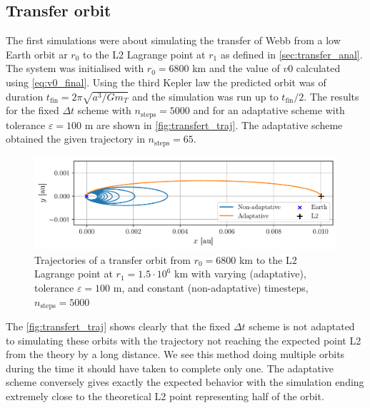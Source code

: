 \subsection{Transfer orbit}
The first simulations were about simulating the transfer of Webb from a low Earth orbit ar $r_0$ to the L2 Lagrange point at $r_1$ as defined in \autoref{sec:transfer_anal}. The system was initialised with \(r_0 = 6800\) km and the value of $v0$ calculated using \autoref{eq:v0_final}. Using the third Kepler law the predicted orbit was of duration $t_\mathrm{fin} = 2\pi\sqrt{a^3/Gm_T}$ and the simulation was run up to $t_\mathrm{fin}/2$. The results for the fixed $\Delta t$ scheme with $n_\mathrm{steps} = 5000$ and for an adaptative scheme with tolerance $\varepsilon = 100$ \si{\meter} are shown in \autoref{fig:transfert_traj}. The adaptative scheme obtained the given trajectory in $n_\mathrm{steps} = 65$.
\begin{figure}[H]
    \centering
    \includegraphics[width=\linewidth]{figures/transfert_comparaison.pdf}
    \caption{Trajectories of a transfer orbit from $r_0 = 6800$ \si{\kilo\meter} to the L2 Lagrange point at $r_1 = 1.5 \cdot 10^6$ \si{\kilo\meter} with varying (adaptative), tolerance $\varepsilon = 100$ \si{\meter}, and constant (non-adaptative) timesteps, $n_\mathrm{steps} = 5000$}
    \label{fig:transfert_traj}
\end{figure}

The \autoref{fig:transfert_traj} shows clearly that the fixed $\Delta t$ scheme is not adaptated to simulating these orbits with the trajectory not reaching the expected point L2 from the theory by a long distance. We see this method doing multiple orbits during the time it should have taken to complete only one. The adaptative scheme conversely gives exactly the expected behavior with the simulation ending extremely close to the theoretical L2 point representing half of the orbit.

